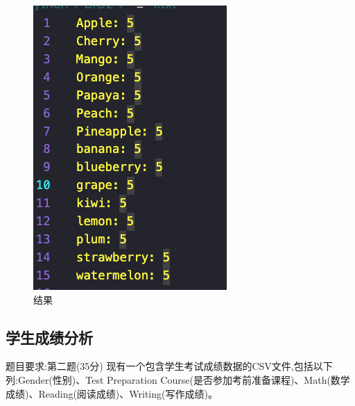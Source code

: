 \documentclass[12pt,a4paper,oneside]{article}
\begin{document}
\begin{figure}[H]
    \centering
    \begin{minipage}{0.1874\textwidth}
        \centering
        \includegraphics[width=\textwidth]{image/1} %
        \caption{结果}
        \label{fig:image1}
    \end{minipage}
\end{figure}


\subsection{学生成绩分析}
题目要求:第二题(35分)
现有一个包含学生考试成绩数据的CSV文件,包括以下列:Gender(性别)、Test Preparation Course(是否参加考前准备课程)、Math(数学成绩)、Reading(阅读成绩)、Writing(写作成绩)。
\end{document}
